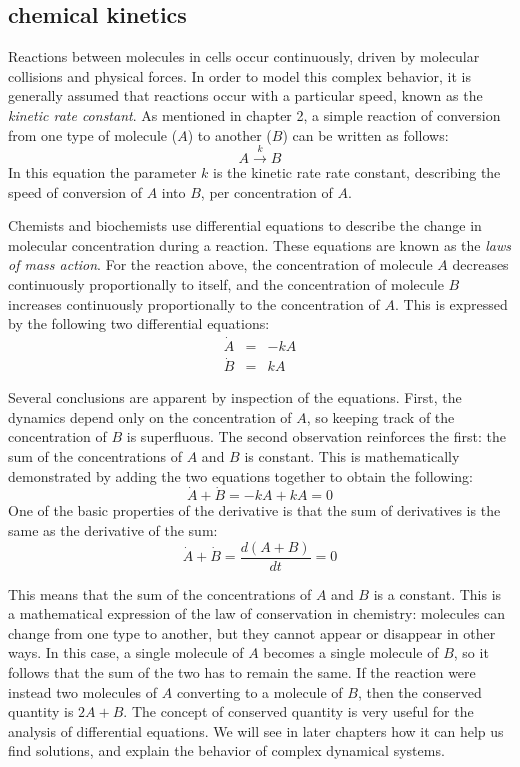 \documentclass[
  letterpaper,
  DIV=11,
  numbers=noendperiod]{scrreprt}
\begin{document}
\hypertarget{chemical-kinetics}{%
\subsection{chemical kinetics}\label{chemical-kinetics}}

Reactions between molecules in cells occur continuously, driven by
molecular collisions and physical forces. In order to model this complex
behavior, it is generally assumed that reactions occur with a particular
speed, known as the  \emph{kinetic rate
constant}. As mentioned in chapter 2, a simple reaction of conversion
from one type of molecule (\(A\)) to another (\(B\)) can be written as
follows: \[ A \xrightarrow{k} B \] In this equation the parameter \(k\)
is the kinetic rate rate constant, describing the speed of conversion of
\(A\) into \(B\), per concentration of \(A\).

Chemists and biochemists use differential equations to describe the
change in molecular concentration during a reaction. These equations are
known as the  \emph{laws of mass
action}. For the reaction above, the concentration of molecule \(A\)
decreases continuously proportionally to itself, and the concentration
of molecule \(B\) increases continuously proportionally to the
concentration of \(A\). This is expressed by the following two
differential equations: \begin{eqnarray}
\label{eq:lin_chem_kin}
\dot A &=& - k A \\
\dot B &=& kA
\end{eqnarray}

Several conclusions are apparent by inspection of the equations. First,
the dynamics depend only on the concentration of \(A\), so keeping track
of the concentration of \(B\) is superfluous. The second observation
reinforces the first: the sum of the concentrations of \(A\) and \(B\)
is constant. This is mathematically demonstrated by adding the two
equations together to obtain the following:
\[ \dot A + \dot B = -kA + kA = 0\] One of the basic properties of the
derivative is that the sum of derivatives is the same as the derivative
of the sum: \[\dot A + \dot B = \frac{d(A+B)}{dt} = 0\]

This means that the sum of the concentrations of \(A\) and \(B\) is a
constant. This is a mathematical expression of the law of conservation
in chemistry: molecules can change from one type to another, but they
cannot appear or disappear in other ways. In this case, a single
molecule of \(A\) becomes a single molecule of \(B\), so it follows that
the sum of the two has to remain the same. If the reaction were instead
two molecules of \(A\) converting to a molecule of \(B\), then the
conserved quantity is \(2A + B\). The concept of conserved quantity is
very useful for the analysis of differential equations. We will see in
later chapters how it can help us find solutions, and explain the
behavior of complex dynamical systems.
\end{document}
